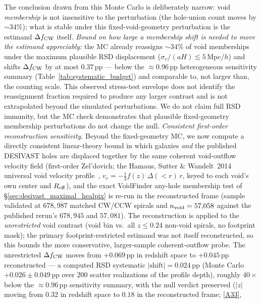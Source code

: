 \documentclass[aps,prd,twocolumn,superscriptaddress,showpacs,preprintnumbers,nofootinbib,longbibliography,floatfix]{revtex4-2}
\newcommand{\repoBase}{https://github.com/Hubify-Projects/bigbounce/blob/main}
\begin{document}
\iffalse
The conclusion drawn from this Monte Carlo is deliberately narrow:
void \emph{membership} is not insensitive to the perturbation (the
hole-union count moves by ${\sim}34\%$); what is stable under this
fixed-void-geometry perturbation is the estimand $\Delta f_{\rm CW}$
itself. \emph{Bound on how large a membership shift is needed to move the
estimand appreciably:} the MC already reassigns ${\sim}34\%$ of
void memberships under the maximum plausible RSD displacement
($\sigma_v/(aH)\!\lesssim\!5$\,Mpc/$h$) and shifts $\Delta f_{\rm CW}$
by at most $0.37$\,pp --- below the
${\approx}0.96$\,pp heterogeneous sensitivity summary
(Table~\ref{tab:systematic_budget}) and comparable to, not larger than,
the counting scale. This observed stress-test envelope does not identify
the reassignment fraction required to produce any larger contrast and is
not extrapolated beyond the simulated perturbations. We do not claim full RSD immunity,
but the MC check demonstrates that plausible fixed-geometry membership
perturbations do not change the null. \emph{Consistent first-order
reconstruction sensitivity.} Beyond the
fixed-geometry MC, we now compute a directly consistent linear-theory
bound in which galaxies \emph{and} the published DESIVAST holes are
displaced together by the same coherent void-outflow velocity field
(first-order Zel'dovich; the Hamaus, Sutter \& Wandelt~2014
universal void velocity profile~\cite{Hamaus2014},
$v_r = -\tfrac{1}{3}f(z)\,\Delta(<r)\,r$, keyed to each void's own
center and $R_{\rm eff}$), and the exact VoidFinder any-hole
membership test of \S\ref{sec:desivast_maximal_healpix} is re-run in the
reconstructed frame (sample validated at $678{,}987$ matched CW/CCW
spirals and $n_{\rm void}=57{,}058$ against the published rerun's
$678{,}945$ and $57{,}081$). The reconstruction is applied to the
\emph{unrestricted} void contrast (void bin vs.\ all $z\le0.24$ non-void
spirals, no footprint mask); the primary footprint-restricted estimand
was not itself reconstructed, so this bounds the more conservative,
larger-sample coherent-outflow probe. The unrestricted
$\Delta f_{\rm CW}$ moves from $+0.069$\,pp in redshift space to
$+0.045$\,pp reconstructed --- a computed RSD systematic
$|\text{shift}| = 0.024$\,pp (Monte Carlo $+0.026 \pm 0.049$\,pp over
$200$ scatter realizations of the profile depth), roughly $40\times$
below the ${\approx}0.96$\,pp sensitivity summary, with the null verdict
preserved ($|z|$ moving from $0.32$ in redshift space to $0.18$ in the
reconstructed frame;
\href{\repoBase/pipelines/p5\_desi\_chirality/outputs/27\_rsd\_void\_recon\_bound.json}{[A33]},
\end{document}
